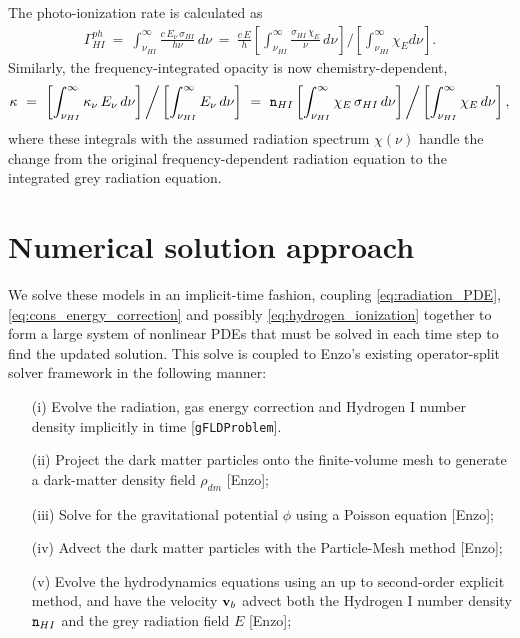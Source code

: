 \documentclass[letterpaper,10pt]{article}
\renewcommand{\(}{\left(}
\renewcommand{\)}{\right)}
\newcommand{\vb}{{\bf v}_b}
\newcommand{\mn}{{\tt n}}
\begin{document}
The photo-ionization rate is calculated as
\begin{align}
  \label{eq:phHI}
  \Gamma_{HI}^{ph} \ = \ \int_{\nu_{HI}}^{\infty}
    \frac{c\,E_{\nu}\,\sigma_{HI}}{h\nu}\, d\nu 
  \ = \ \frac{c\,E}{h} 
    \left[\int_{\nu_{HI}}^{\infty} \frac{\sigma_{HI}\, \chi_E}{\nu}\,
      d\nu\right] \bigg/ \left[\int_{\nu_{HI}}^{\infty} \chi_E d\nu\right].
\end{align}
Similarly, the frequency-integrated opacity is now chemistry-dependent,
\begin{equation}
\label{eq:opacityHI}
  \kappa \ = \ 
  \left[\int_{\nu_{HI}}^{\infty} \kappa_{\nu}\,E_{\nu}\,d\nu\right] \bigg/
  \left[\int_{\nu_{HI}}^{\infty} E_{\nu}\,d\nu\right] \ = \ 
  \mn_{HI} \left[\int_{\nu_{HI}}^{\infty}
    \chi_E\,\sigma_{HI}\,d\nu\right] \bigg/
  \left[\int_{\nu_{HI}}^{\infty} \chi_E\,d\nu\right],
\end{equation}
where these integrals with the assumed radiation spectrum $\chi(\nu)$
handle the change from the original frequency-dependent radiation
equation to the integrated grey radiation equation. 




\section{Numerical solution approach}
\label{sec:solution_approach}

We solve these models in an implicit-time fashion, coupling 
\eqref{eq:radiation_PDE}, \eqref{eq:cons_energy_correction} and
possibly \eqref{eq:hydrogen_ionization} together to form a large
system of nonlinear PDEs that must be solved in each time step to find
the updated solution.  This solve is coupled to Enzo's existing
operator-split solver framework in the following manner:
\begin{itemize}
\item[(i)] Evolve the radiation, gas energy correction and Hydrogen I
  number density implicitly in time [{\tt gFLDProblem}].
\item[(ii)] Project the dark matter particles onto the finite-volume
  mesh to generate a dark-matter density field $\rho_{dm}$ [Enzo];
\item[(iii)] Solve for the gravitational potential $\phi$ using a
  Poisson equation [Enzo];
\item[(iv)] Advect the dark matter particles with the Particle-Mesh
  method [Enzo];
\item[(v)] Evolve the hydrodynamics equations using an up to
  second-order explicit method, and have the velocity $\vb$ advect
  both the Hydrogen I number density $\mn_{HI}$ and the grey radiation
  field $E$ [Enzo]; 
\end{itemize}
\end{document}
